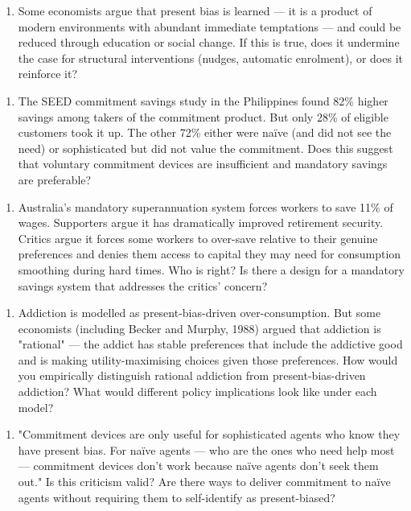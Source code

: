 \documentclass[12pt, letterpaper]{article}
\begin{document}
\begin{enumerate}
\item Some economists argue that present bias is learned --- it is a product of modern environments with abundant immediate temptations --- and could be reduced through education or social change. If this is true, does it undermine the case for structural interventions (nudges, automatic enrolment), or does it reinforce it?
\end{enumerate}

\begin{enumerate}
\item The SEED commitment savings study in the Philippines found 82\% higher savings among takers of the commitment product. But only 28\% of eligible customers took it up. The other 72\% either were naïve (and did not see the need) or sophisticated but did not value the commitment. Does this suggest that voluntary commitment devices are insufficient and mandatory savings are preferable?
\end{enumerate}

\begin{enumerate}
\item Australia's mandatory superannuation system forces workers to save 11\% of wages. Supporters argue it has dramatically improved retirement security. Critics argue it forces some workers to over-save relative to their genuine preferences and denies them access to capital they may need for consumption smoothing during hard times. Who is right? Is there a design for a mandatory savings system that addresses the critics' concern?
\end{enumerate}

\begin{enumerate}
\item Addiction is modelled as present-bias-driven over-consumption. But some economists (including Becker and Murphy, 1988) argued that addiction is "rational" --- the addict has stable preferences that include the addictive good and is making utility-maximising choices given those preferences. How would you empirically distinguish rational addiction from present-bias-driven addiction? What would different policy implications look like under each model?
\end{enumerate}

\begin{enumerate}
\item "Commitment devices are only useful for sophisticated agents who know they have present bias. For naïve agents --- who are the ones who need help most --- commitment devices don't work because naïve agents don't seek them out." Is this criticism valid? Are there ways to deliver commitment to naïve agents without requiring them to self-identify as present-biased?
\end{enumerate}
\end{document}
